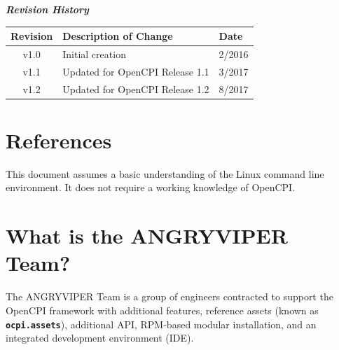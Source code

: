        \begin{center}
        \textit{\textbf{Revision History}}
                \begin{table}[H]
                \label{table:revisions} %
                        \begin{tabularx}{\textwidth}{|c|X|l|}
                        \hline
                        \rowcolor{blue}
                        \textbf{Revision} & \textbf{Description of Change} & \textbf{Date} \\
                        \hline
                        v1.0 & Initial creation & 2/2016 \\
                        \hline
                        v1.1 & Updated for OpenCPI Release 1.1 & 3/2017 \\
			            \hline
                        v1.2 & Updated for OpenCPI Release 1.2 & 8/2017 \\
                        \hline
                        \end{tabularx}
                \end{table}
        \end{center}

\newpage

\tableofcontents

\newpage

\listoffigures

\newpage

\listoftables

\newpage

\section{References}

This document assumes a basic understanding of the Linux command line environment. It does not require a working knowledge of OpenCPI.
\def\refskipgs{} %
\def\myreferences{
\hline
Component Development Guide & OpenCPI & \url{https://goo.gl/zBwIe0} \\
\hline
RCC Development Guide & OpenCPI & \url{https://goo.gl/0ix1E0} \\
\hline
HDL Development Guide & OpenCPI & \url{https://goo.gl/OVmRhI} \\
}


\newpage
\section{What is the ANGRYVIPER Team?}
\label{sec:what_is_angryviper}
The ANGRYVIPER Team is a group of engineers contracted to support the OpenCPI framework with additional features, reference assets (known as \textbf{\texttt{ocpi.assets}}), additional API, RPM-based modular installation, and an integrated development environment (IDE).

